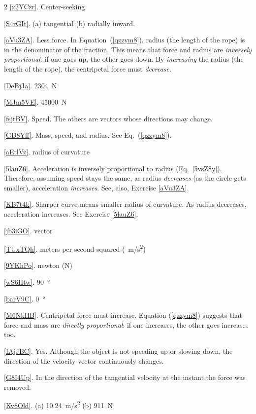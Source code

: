 \documentclass[dvipsnames]{article}
\numberwithin{equation}{section}
\numberwithin{figure}{section}
\begin{document}
\begin{multicols}{2}
\ref{x2YCzr}. Center-seeking

\ref{S4rGIt}. (a) tangential \hspace{1em} (b) radially inward.

\ref{aVu3ZA}. Less force. In Equation~(\ref{qzzym8}), radius (the length of the rope) is in the denominator of the fraction. This means that force and radius are \textit{inversely proportional}: if one goes up, the other goes down. By \textit{increasing} the radius (the length of the rope), the centripetal force must \textit{decrease}.

\ref{DeBjJa}. \SI{2304}{N}

\ref{MJm5VE}. \SI{45000}{N}

\ref{fsjtBV}. Speed. The others are vectors whose directions may change.

\ref{GD8Yff}. Mass, speed, and radius. See Eq.~(\ref{qzzym8}).

\ref{aEtlVz}. radius of curvature

\ref{5lauZ6}. Acceleration is inversely proportional to radius (Eq.~\ref{5vsZ8y}). Therefore, assuming speed stays the same, as radius \textit{decreases} (as the circle gets smaller), acceleration \textit{increases}. See, also, Exercise \ref{aVu3ZA}.

\ref{KB7t4k}. Sharper curve means smaller radius of curvature. As radius decreases, acceleration increases. See Exercise \ref{5lauZ6}.

\ref{jb3iGO}. vector

\ref{TUxTQh}. meters per second squared (\SI{}{m/s^2})

\ref{9YKhPo}. newton (N)

\ref{wS6Htw}. \SI{90}{\degree}

\ref{barV9C}. \SI{0}{\degree}

\ref{M6NkHB}. Centripetal force must increase. Equation (\ref{qzzym8}) suggests that force and mass are \textit{directly proportional}: if one increases, the other goes increases too. 

\ref{IAjJBC}. Yes. Although the object is not speeding up or slowing down, the direction of the velocity vector continuously changes. 

\ref{G8I4Up}. In the direction of the tangential velocity at the instant the force was removed.

\ref{Kv8Old}. (a) \SI{10.24}{m/s^2} \hspace{1em} (b) \SI{911}{N}


\end{multicols}
\end{document}
